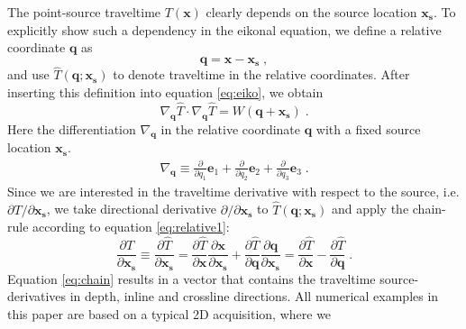The point-source traveltime $T(\mathbf{x})$ clearly depends on the source location $\mathbf{x_s}$. To 
explicitly show such a dependency in the eikonal equation, we define a relative coordinate $\mathbf{q}$ 
as
\begin{equation}
\label{eq:relative1}
\mathbf{q = x - x_s}\;,
\end{equation}
and use $\hat{T}(\mathbf{q};\mathbf{x_s})$ to denote traveltime in the relative coordinates. After 
inserting this definition into equation \ref{eq:eiko}, we obtain
\begin{equation}
\label{eq:insert}
\nabla_{\mathbf{q}} \hat{T} \cdot \nabla_{\mathbf{q}} \hat{T} = W (\mathbf{q+x_s})\;.
\end{equation}
Here the differentiation $\nabla_{\mathbf{q}}$  in 
the relative coordinate $\mathbf{q}$ with a fixed source location $\mathbf{x_s}$. 
\begin{eqnarray}
\nabla_{\mathbf{q}} \equiv 
\frac{\partial}{\partial q_1} \mathbf{e}_1 +
\frac{\partial}{\partial q_2} \mathbf{e}_2 +
\frac{\partial}{\partial q_3} \mathbf{e}_3\;.
\end{eqnarray}
Since we are interested in the traveltime derivative with respect to the source, i.e. 
$\partial T / \partial \mathbf{x_s}$, we take directional derivative 
$\partial / \partial \mathbf{x_s}$ to $\hat{T}(\mathbf{q};\mathbf{x_s})$ and apply the chain-rule 
according to equation \ref{eq:relative1}:
\begin{equation}
\label{eq:chain}
\frac{\partial T}{\partial \mathbf{x_s}} \equiv \frac{\partial \hat{T}}{\partial \mathbf{x_s}} 
= \frac{\partial \hat{T}}{\partial \mathbf{x}} \frac{\partial \mathbf{x}}{\partial \mathbf{x_s}} 
+ \frac{\partial \hat{T}}{\partial \mathbf{q}} \frac{\partial \mathbf{q}}{\partial \mathbf{x_s}} 
= \frac{\partial \hat{T}}{\partial \mathbf{x}} - \frac{\partial \hat{T}}{\partial \mathbf{q}}\;.
\end{equation}
Equation \ref{eq:chain} results in a vector that contains the traveltime source-derivatives in 
depth, inline and crossline directions. All numerical examples in this paper are based on a typical 2D acquisition, where we 

